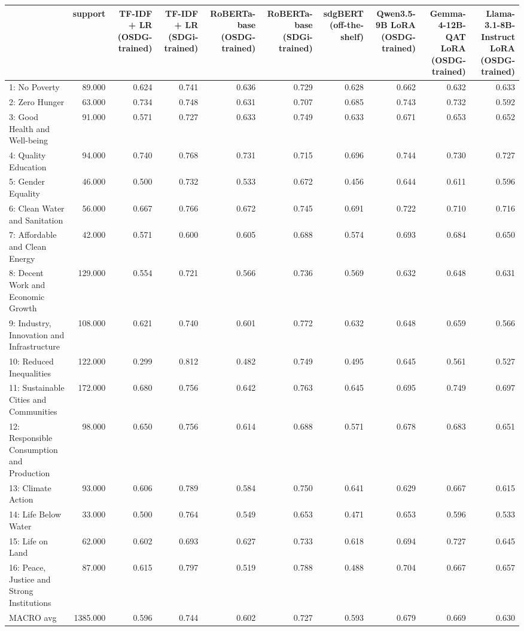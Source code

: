 \begin{tabular}{lrrrrrrrrr}
\toprule
 & support & TF-IDF + LR (OSDG-trained) & TF-IDF + LR (SDGi-trained) & RoBERTa-base (OSDG-trained) & RoBERTa-base (SDGi-trained) & sdgBERT (off-the-shelf) & Qwen3.5-9B LoRA (OSDG-trained) & Gemma-4-12B-QAT LoRA (OSDG-trained) & Llama-3.1-8B-Instruct LoRA (OSDG-trained) \\
\midrule
1: No Poverty & 89.000 & 0.624 & 0.741 & 0.636 & 0.729 & 0.628 & 0.662 & 0.632 & 0.633 \\
2: Zero Hunger & 63.000 & 0.734 & 0.748 & 0.631 & 0.707 & 0.685 & 0.743 & 0.732 & 0.592 \\
3: Good Health and Well-being & 91.000 & 0.571 & 0.727 & 0.633 & 0.749 & 0.633 & 0.671 & 0.653 & 0.652 \\
4: Quality Education & 94.000 & 0.740 & 0.768 & 0.731 & 0.715 & 0.696 & 0.744 & 0.730 & 0.727 \\
5: Gender Equality & 46.000 & 0.500 & 0.732 & 0.533 & 0.672 & 0.456 & 0.644 & 0.611 & 0.596 \\
6: Clean Water and Sanitation & 56.000 & 0.667 & 0.766 & 0.672 & 0.745 & 0.691 & 0.722 & 0.710 & 0.716 \\
7: Affordable and Clean Energy & 42.000 & 0.571 & 0.600 & 0.605 & 0.688 & 0.574 & 0.693 & 0.684 & 0.650 \\
8: Decent Work and Economic Growth & 129.000 & 0.554 & 0.721 & 0.566 & 0.736 & 0.569 & 0.632 & 0.648 & 0.631 \\
9: Industry, Innovation and Infrastructure & 108.000 & 0.621 & 0.740 & 0.601 & 0.772 & 0.632 & 0.648 & 0.659 & 0.566 \\
10: Reduced Inequalities & 122.000 & 0.299 & 0.812 & 0.482 & 0.749 & 0.495 & 0.645 & 0.561 & 0.527 \\
11: Sustainable Cities and Communities & 172.000 & 0.680 & 0.756 & 0.642 & 0.763 & 0.645 & 0.695 & 0.749 & 0.697 \\
12: Responsible Consumption and Production & 98.000 & 0.650 & 0.756 & 0.614 & 0.688 & 0.571 & 0.678 & 0.683 & 0.651 \\
13: Climate Action & 93.000 & 0.606 & 0.789 & 0.584 & 0.750 & 0.641 & 0.629 & 0.667 & 0.615 \\
14: Life Below Water & 33.000 & 0.500 & 0.764 & 0.549 & 0.653 & 0.471 & 0.653 & 0.596 & 0.533 \\
15: Life on Land & 62.000 & 0.602 & 0.693 & 0.627 & 0.733 & 0.618 & 0.694 & 0.727 & 0.645 \\
16: Peace, Justice and Strong Institutions & 87.000 & 0.615 & 0.797 & 0.519 & 0.788 & 0.488 & 0.704 & 0.667 & 0.657 \\
MACRO avg & 1385.000 & 0.596 & 0.744 & 0.602 & 0.727 & 0.593 & 0.679 & 0.669 & 0.630 \\
\bottomrule
\end{tabular}
